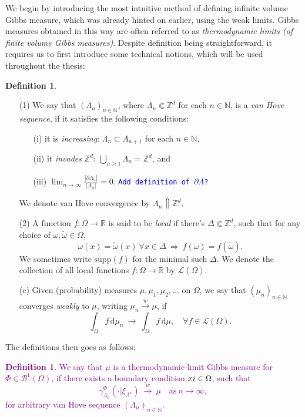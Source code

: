 \documentclass[12pt]{article}
\newcommand{\BB}{\mathscr{B}}
\renewcommand{\d}{\mathrm{d}}
\newcommand{\Loc}{\mathcal{L}}
\newcommand{\N}{\mathbb{N}}
\newcommand{\R}{\mathbb{R}}
\newcommand{\Z}{\mathbb{Z}}
\newcommand{\ra}{\rightarrow}
\newcommand{\pika}{\boldsymbol{\cdot}}
\newcommand{\1}{\mathbbm{1}}
\renewcommand{\c}{\mathsf{c}}
\newcommand{\supp}{\mathrm{supp}}
\newcommand{\5}{\vspace{0.5cm}}
\renewcommand{\tilde}{\widetilde}
\theoremstyle{definition}
\newtheorem{df}[thm]{Definition}
\begin{document}
We begin by introducing the most intuitive method of defining infinite volume Gibbs measure, which was already hinted on earlier, using the weak limits. Gibbs measures obtained in this way are often referred to as \textit{thermodynamic limits (of finite volume Gibbs measures)}. Despite definition being straightforward, it requires us to first introduce some technical notions, which will be used throughout the thesis:

\begin{df}
~
\begin{itemize}
	\item[(1)] We say that $(\Lambda_n)_{n\in\N}$, where $\Lambda_n\Subset\Z^d$ for each $n\in\N$, is a \textit{van Hove sequence}, if it satisfies the following conditions:
	\begin{itemize}
		\item[(i)] it is \textit{increasing}: $\Lambda_n\subset\Lambda_{n+1}$ for each $n\in\N$,
		\item[(ii)] it \textit{invades} $\Z^d$: $\bigcup_{n\geq 1}\Lambda_n=\Z^d$, and
		\item[(iii)] $\lim_{n\ra\infty}\frac{|\partial\Lambda_n|}{|\Lambda_n|}=0$. \textcolor{blue}{\texttt{Add definition of $\partial\Lambda$?}}
	\end{itemize}
	We denote van Hove convergence by $\Lambda_n\Uparrow\Z^d$.
	\item[(2)] A function $f:\Omega\ra\R$ is said to be \textit{local} if there's $\Delta\Subset\Z^d$, such that for any choice of $\omega,\tilde{\omega}\in\Omega$, 
	$$\omega(x)=\tilde{\omega}(x)~\forall x\in\Delta ~\Longrightarrow~ f(\omega)=f(\tilde{\omega}).$$
	We sometimes write $\supp(f)$ for the minimal such $\Delta$. We denote the collection of all local functions $f:\Omega\ra\R$ by $\Loc(\Omega)$.
	\item[(c)] Given (probability) measures $\mu,\mu_1,\mu_2,\ldots$ on $\Omega$, we say that $(\mu_n)_{n\in\N}$ converges \textit{weakly} to $\mu$, writing $\mu_n\xrightarrow{w}\mu$, if
	$$\int_\Omega f\,\d\mu_n ~\ra~ \int_\Omega f\,\d\mu, \quad \forall f\in\Loc(\Omega).$$
\end{itemize}
\end{df}

The definitions then goes as follows:
\textcolor{purple}{
\begin{df}
We say that $\mu$ is a thermodynamic-limit Gibbs measure for $\Phi\in\BB^1(\Omega)$, if there exists a boundary condition $\\xi\in\Omega$, such that
$$\gamma_{\Lambda_n}^\Phi(\pika|\xi_{\Lambda^\c}) ~\xrightarrow{w}~ \mu \quad \text{as}~n\ra\infty,$$
for arbitrary van Hove sequence $(\Lambda_n)_{n\in\N}$.
\end{df}
}
\end{document}
